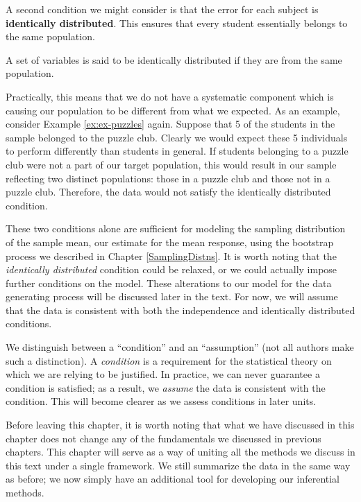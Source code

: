 \documentclass[]{book}
\theoremstyle{plain}
\theoremstyle{mydefn}
\theoremstyle{myexmpl}
\theoremstyle{remark}
\let\BeginKnitrBlock\begin \let\EndKnitrBlock\end
\let\BeginKnitrBlock\begin \let\EndKnitrBlock\end
\begin{document}
A second condition we might consider is that the error for each subject
is \textbf{identically distributed}. This ensures that every student
essentially belongs to the same population.

\BeginKnitrBlock{definition}[Identically Distributed]
\protect\hypertarget{def:defn-identically-distributed}{}{\label{def:defn-identically-distributed}
{} }A set of variables is said to
be identically distributed if they are from the same population.
\EndKnitrBlock{definition}

Practically, this means that we do not have a systematic component which
is causing our population to be different from what we expected. As an
example, consider Example \ref{ex:ex-puzzles} again. Suppose that 5 of
the students in the sample belonged to the puzzle club. Clearly we would
expect these 5 individuals to perform differently than students in
general. If students belonging to a puzzle club were not a part of our
target population, this would result in our sample reflecting two
distinct populations: those in a puzzle club and those not in a puzzle
club. Therefore, the data would not satisfy the identically distributed
condition.

These two conditions alone are sufficient for modeling the sampling
distribution of the sample mean, our estimate for the mean response,
using the bootstrap process we described in Chapter
\ref{SamplingDistns}. It is worth noting that the \emph{identically
distributed} condition could be relaxed, or we could actually impose
further conditions on the model. These alterations to our model for the
data generating process will be discussed later in the text. For now, we
will assume that the data is consistent with both the independence and
identically distributed conditions.

\BeginKnitrBlock{rmdtip}
We distinguish between a ``condition'' and an ``assumption'' (not all
authors make such a distinction). A \emph{condition} is a requirement
for the statistical theory on which we are relying to be justified. In
practice, we can never guarantee a condition is satisfied; as a result,
we \emph{assume} the data is consistent with the condition. This will
become clearer as we assess conditions in later units.
\EndKnitrBlock{rmdtip}

Before leaving this chapter, it is worth noting that what we have
discussed in this chapter does not change any of the fundamentals we
discussed in previous chapters. This chapter will serve as a way of
uniting all the methods we discuss in this text under a single
framework. We still summarize the data in the same way as before; we now
simply have an additional tool for developing our inferential methods.
\end{document}
